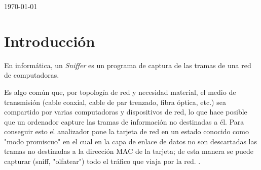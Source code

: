 \documentclass[a4paper,12pt]{article}
\begin{document}
\begin{titlepage}


{\large \today}\\[2cm] %

\vfill %

\end{titlepage}

\section{Introducción}
En informática, un \textit{Sniffer} es un programa de captura de las tramas de una red de computadoras.

Es algo común que, por topología de red y necesidad material, el medio de transmisión (cable coaxial, cable de par trenzado, fibra óptica, etc.) sea compartido por varias computadoras y dispositivos de red, lo que hace posible que un ordenador capture las tramas de información no destinadas a él. Para conseguir esto el analizador pone la tarjeta de red en un estado conocido como "modo promiscuo" en el cual en la capa de enlace de datos no son descartadas las tramas no destinadas a la dirección MAC de la tarjeta; de esta manera se puede capturar (sniff, "olfatear") todo el tráfico que viaja por la red.
.
\end{document}
